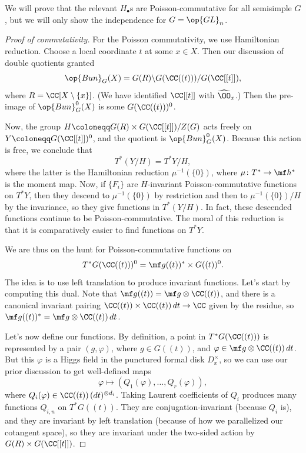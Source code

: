 \documentclass[../notes.tex]{subfiles}
\begin{document}
We will prove that the relevant $H_\bullet$s are Poisson-commutative for all semisimple $G$, but we will only show the independence for $G=\op{GL}_n$.
\begin{proof}[Proof of commutativity]
	For the Poisson commutativity, we use Hamiltonian reduction. Choose a local coordinate $t$ at some $x\in X$. Then our discussion of double quotients granted
	\[\op{Bun}_G(X)=G(R)\backslash G(\CC((t)))/G(\CC[[t]]),\]
	where $R=\CC[X\setminus\{x\}]$. (We have identified $\CC[[t]]$ with $\widehat\OO_x$.) Then the pre-image of $\op{Bun}_G^0(X)$ is some $G(\CC((t)))^0$.

	Now, the group $H\coloneqq G(R)\times G(\CC[[t]])/Z(G)$ acts freely on $Y\coloneqq G(\CC[[t]])^0$, and the quotient is $\op{Bun}_G^0(X)$. Because this action is free, we conclude that
	\[T^*(Y/H)=T^*Y/H,\]
	where the latter is the Hamiltonian reduction $\mu^{-1}(\{0\})$, where $\mu\colon T^*\to\mf h^*$ is the moment map. Now, if $\{F_i\}$ are $H$-invariant Poisson-commutative functions on $T^*Y$, then they descend to $\mu^{-1}(\{0\})$ by restriction and then to $\mu^{-1}(\{0\})/H$ by the invariance, so they give functions in $T^*(Y/H)$. In fact, these descended functions continue to be Poisson-commutative. The moral of this reduction is that it is comparatively easier to find functions on $T^*Y$.

	We are thus on the hunt for Poisson-commutative functions on
	\[T^*G(\CC((t)))^0=\mf g((t))^*\times G((t))^0.\]
	The idea is to use left translation to produce invariant functions. Let's start by computing this dual. Note that $\mf g((t))=\mf g\otimes\CC((t))$, and there is a canonical invariant pairing $\CC((t))\times\CC((t))\,dt\to\CC$ given by the residue, so $\mf g((t))^*=\mf g\otimes\CC((t))\,dt$.

	Let's now define our functions. By definition, a point in $T^*G(\CC((t)))$ is represented by a pair $(g,\varphi)$, where $g\in G((t))$, and $\varphi\in\mf g\otimes\CC((t))\,dt$. But this $\varphi$ is a Higgs field in the punctured formal disk $D_x^\times$, so we can use our prior discussion to get well-defined maps
	\[\varphi\mapsto(Q_1(\varphi),\ldots,Q_r(\varphi)),\]
	where $Q_i(\varphi)\in\CC((t))\,(dt)^{\otimes d_i}$. Taking Laurent coefficients of $Q_i$ produces many functions $Q_{i,n}$ on $T^*G((t))$. They are conjugation-invariant (because $Q_i$ is), and they are invariant by left translation (because of how we parallelized our cotangent space), so they are invariant under the two-sided action by $G(R)\times G(\CC[[t]])$.
	

\end{proof}
\end{document}
